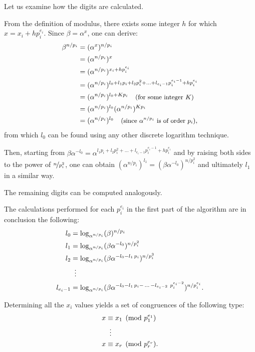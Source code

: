 \documentclass[UTF8]{article}
\begin{document}
Let us examine how the digits are calculated.

From the definition of modulus, there exists some integer $h$ for which $x=x_i+hp_i^{e_i}$. Since \mbox{$\beta=\alpha^x$}, one can derive:
\begin{align*}
    \beta^{n/p_i} & = (\alpha^x)^{n/p_i} \\
                  & = (\alpha^{n/p_i})^x \\
                  & = (\alpha^{n/p_i})^{x_i+hp_i^{e_i}} \\
                  & = (\alpha^{n/p_i})^{l_0 + l_1 p_i + l_2 p_i^2 + \ldots + l_{e_i - 1} p_i^{e_i - 1}+hp_i^{e_i}} \\
                  & = (\alpha^{n/p_i})^{l_0 + K p_i} \quad \text{\small{(for some integer $K$)}}  \\
                  & = (\alpha^{n/p_i})^{l_0} (\alpha^{n/p_i})^{K p_i} \\
                  & = (\alpha^{n/p_i})^{l_0} \quad \text{\small{(since $\alpha^{n/p_i}$ is of order $p_i$)}},
\end{align*}
from which $l_0$ can be found using any other discrete logarithm technique.

Then, starting from $\beta\alpha^{-l_0} = \alpha^{l_1 p_i + l_2 p_i^2 + \ldots + l_{e_i - 1} p_i^{e_i - 1}+hp_i^{e_i}}$ and by raising both sides to the power of $\nicefrac{n}{p_i^2}$, one can obtain $(\alpha^{n/p_i})^{l_1}=(\beta\alpha^{-l_0})^{n/p_i^2}$ and ultimately $l_1$ in a similar way.

The remaining digits can be computed analogously.

The calculations performed for each $p_i^{e_i}$ in the first part of the algorithm are in conclusion the following:
\begin{align*}
    l_0         &              = \log_{\alpha^{n / p_i}}(\beta)^{n / p_i} \\
    l_1         &              = \log_{\alpha^{n / p_i}}(\beta\alpha^{-l_0})^{n / p_i^2} \\
    l_2         &              = \log_{\alpha^{n / p_i}}(\beta\alpha^{-l_0 - l_1 \, p_i})^{n / p_i^3} \\
                & \vdotswithin{=} \\
    l_{e_i - 1} &              = \log_{\alpha^{n / p_i}}(\beta\alpha^{-l_0 - l_1 \, p_i - \, \ldots \, - l_{e_i - 2} \ p_i^{e_i - 2}})^{n / p_i^{e_i}}.
\end{align*}

Determining all the $x_i$ values yields a set of congruences of the following type:
\begin{align*}
    x & \equiv x_1 \pmod{p_1^{e_1}} \\
      & \vdotswithin{\equiv}        \\
    x & \equiv x_r \pmod{p_r^{e_r}}.
\end{align*}
\end{document}
